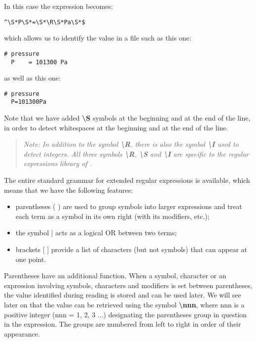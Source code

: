 In this case the expression becomes:
\lstset{language=C++, basicstyle=\normalsize}
\begin{lstlisting}[frame=TBRL]
  ^\S*P\S*=\S*\R\S*Pa\S*$
\end{lstlisting}

which allows us to identify the value in a file such as this one:
\lstset{language=C++, basicstyle=\normalsize}
\begin{lstlisting}[frame=TBRL]
  # pressure
  P    = 101300 Pa
\end{lstlisting}

as well as this one:
\lstset{language=C++, basicstyle=\normalsize}
\begin{lstlisting}[frame=TBRL]
  # pressure
  P=101300Pa
\end{lstlisting}

Note that we have added {\bf \textbackslash S} symbols at the beginning and at the end of the line, in order to detect whitespaces at the beginning and at the end of the line.

\small
\begin{quote}
  \textit{Note: In addition to the symbol {\bf \textbackslash R}, there is also the symbol {\bf \textbackslash I} used to detect integers. All three symbols {\bf \textbackslash R}, {\bf \textbackslash S} and {\bf \textbackslash I} are specific to the regular expressions library of \OT.}
\end{quote}
\normalsize

The entire standard grammar for extended regular expressions is available, which means that we have the following features:
\begin{itemize}
\item parentheses ( ) are used to group symbols into larger expressions and treat each term as a symbol in its own right (with its modifiers, etc.);
\item the symbol | acts as a logical OR between two terms;
\item brackets [ ] provide a list of characters (but not symbols) that can appear at one point.
\end{itemize}

Parentheses have an additional function. When a symbol, character or an expression involving symbols, characters and modifiers is set between parentheses, the value identified during reading is stored and can be used later. We will see later on that the value can be retrieved using the symbol {\bf \textbackslash nnn}, where nnn is a positive integer (nnn = 1, 2, 3 ...) designating the parentheses group in question in the expression. The groups are numbered from left to right in order of their appearance.

